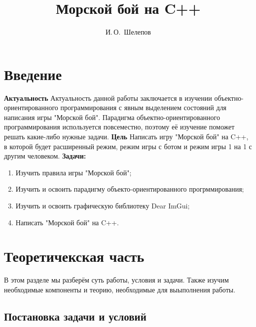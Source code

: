 \documentclass[14pt, oneside]{altsu-report}
\title{Морской бой на C++}
\author{И.\,О.~Шелепов}
\institute{Институт цифровых технологий, электроники и физики}
\date{\the\year}
\begin{document}
\maketitle

\setcounter{page}{2}
\makeabstract
\tableofcontents

\chapter*{Введение}

\textbf{Актуальность}
\newline
Актуальность данной работы заключается в изучении объектно-ориентированного программирования с явным выделением состояний для написания игры "Морской бой". Парадигма объектно-ориентированного программирования используется повсеместно, поэтому её изучение поможет решать какие-либо нужные задачи.
\newline
\textbf{Цель}
\newline
Написать игру "Морской бой" на C++, в которой будет расширенный режим, режим игры с ботом и режим игры 1 на 1 с другим человеком.
\newline
\textbf{Задачи:}
\begin{enumerate}
\item Изучить правила игры "Морской бой";
\item Изучить и освоить парадигму объекто-ориентированного прогрммирования;
\item Изучить и освоить графическую библиотеку Dear ImGui;
\item Написать "Морской бой" на C++.
\end{enumerate}





\chapter{Теоретичекская часть}
В этом разделе мы разберём суть работы, условия и задачи. Также изучим необходимые компоненты и теорию, необходимые для выыполнения работы.
\section{Постановка задачи и условий}
\end{document}
